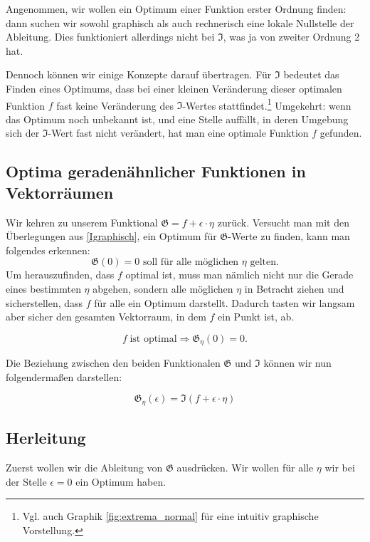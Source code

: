Angenommen, wir wollen ein Optimum einer Funktion erster Ordnung finden: dann suchen wir sowohl graphisch als auch rechnerisch eine lokale Nullstelle der Ableitung. 
Dies funktioniert allerdings nicht bei $\mathfrak{I}$, was ja von zweiter Ordnung 2 hat. 

Dennoch können wir einige Konzepte darauf übertragen.
Für $\mathfrak{I}$ bedeutet das Finden eines Optimums, dass bei einer kleinen Veränderung dieser optimalen Funktion $f$ fast keine Veränderung des $\mathfrak{I}$-Wertes stattfindet.\footnote{Vgl. auch Graphik \ref{fig:extrema_normal} für eine intuitiv graphische Vorstellung.}
Umgekehrt: wenn das Optimum noch unbekannt ist, und eine Stelle auffällt, in deren Umgebung sich der $\mathfrak{I}$-Wert fast nicht verändert, hat man eine optimale Funktion $f$ gefunden.

\subsection{Optima geradenähnlicher Funktionen in Vektorräumen}
Wir kehren zu unserem Funktional $\mathfrak{G}= f + \epsilon \cdot \eta$ zurück. 
Versucht man mit den Überlegungen aus \ref{Igraphisch}, ein Optimum für $\mathfrak{G}$-Werte zu finden, kann man folgendes erkennen:
$$
\mathfrak{G}(0)=0 \hspace{4pt} \text{soll für alle möglichen $\eta$ gelten.}
$$
Um herauszufinden, dass $f$ optimal ist, muss man nämlich nicht nur die Gerade eines bestimmten $\eta$ abgehen, sondern alle möglichen $\eta$ in Betracht ziehen und sicherstellen, dass $f$ für alle ein Optimum darstellt. Dadurch tasten wir langsam aber sicher den gesamten Vektorraum, in dem $f$ ein Punkt ist, ab.

\begin{equation}
 f \hspace{3pt}\text{ist optimal} \Rightarrow \mathfrak{G}_{\eta}(0)=0.
\end{equation}

Die Beziehung zwischen den beiden Funktionalen $\mathfrak{G}$ und $\mathfrak{I}$ können wir nun folgendermaßen darstellen:

\begin{equation} \label{i&g}
\mathfrak{G}_{\eta}(\epsilon)
=\mathfrak{I}(f+\epsilon \cdot \eta)
\end{equation}

\subsection{Herleitung}
Zuerst wollen wir die Ableitung von $\mathfrak{G}$ ausdrücken.
Wir wollen für alle $\eta$ wir bei der Stelle $\epsilon=0$ ein Optimum haben.


